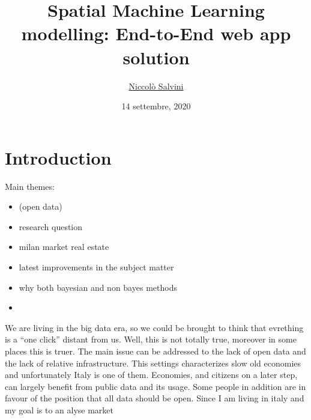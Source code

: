 \documentclass[
  12pt,
  a4paper,
  oneside]{book}
\title{Spatial Machine Learning modelling: End-to-End web app solution}
\author{\href{https://niccolosalvini.netlify.app/}{Niccolò Salvini}}
\date{14 settembre, 2020}
\let\oldmaketitle\maketitle
\begin{document}
\maketitle


\newpage

\let\maketitle\oldmaketitle
\maketitle

{
\setcounter{tocdepth}{1}
\tableofcontents
}
\hypertarget{intro}{%
\chapter{Introduction}\label{intro}}

Main themes:

\begin{itemize}
\item
  (open data)
\item
  research question
\item
  milan market real estate
\item
  latest improvements in the subject matter
\item
  why both bayesian and non bayes methods
\item
\end{itemize}

We are living in the big data era, so we could be brought to think that evrething is a ``one click'' distant from us. Well, this is not totally true, moreover in some places this is truer. The main issue can be addressed to the lack of open data and the lack of relative infrastructure. This settings characterizes slow old economies and unfortunately Italy is one of them. Economies, and citizens on a later step, can largely benefit from public data and its usage. Some people in addition are in favour of the position that all data should be open.
Since I am living in italy and my \citep{lovelace_geocomputation_2019} goal is to an \citep{R-furrr} alyse market
\end{document}
